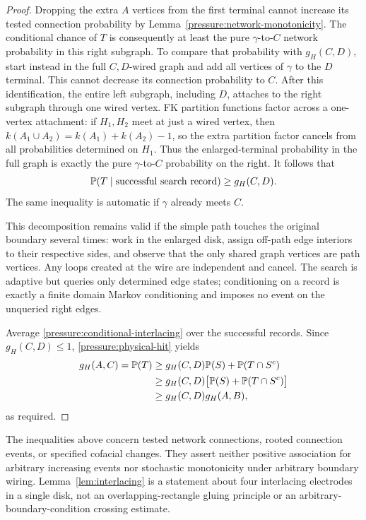 \begin{proof}
Dropping the extra $A$ vertices from the first terminal cannot increase
its tested connection probability by
Lemma~\ref{pressure:network-monotonicity}. The conditional chance
of $T$ is consequently at least the pure $\gamma$-to-$C$ network
probability in this right subgraph. To compare that probability
with $g_H(C,D)$, start instead in the full $C,D$-wired graph and add
all vertices of $\gamma$ to the $D$ terminal. This cannot decrease its
connection probability to $C$. After this identification, the
entire left subgraph, including $D$, attaches to the right subgraph
through one wired vertex. FK partition functions factor across a
one-vertex attachment: if $H_1,H_2$ meet at just a wired vertex,
then $k(A_1\cup A_2)=k(A_1)+k(A_2)-1$, so the extra partition
factor cancels from all probabilities determined on $H_1$.
Thus the enlarged-terminal probability in the full graph is exactly
the pure $\gamma$-to-$C$ probability on the right. It follows that
\begin{equation}
 \mathbb P(T\mid\text{successful search record})\ge g_H(C,D).
 \label{pressure:conditional-interlacing}
\end{equation}
The same inequality is automatic if $\gamma$ already meets $C$.

This decomposition remains valid if the simple path touches the
original boundary several times: work in the enlarged disk,
assign off-path edge interiors to their respective sides, and
observe that the only shared graph vertices are path vertices.
Any loops created at the wire are independent and cancel.
The search is adaptive but queries only determined edge states;
conditioning on a record is exactly a finite domain Markov
conditioning and imposes no event on the unqueried right edges.

Average \eqref{pressure:conditional-interlacing} over the successful
records. Since $g_H(C,D)\le1$, \eqref{pressure:physical-hit} yields
\begin{align*}
 g_H(A,C)=\mathbb P(T)
 &\ge g_H(C,D)\mathbb P(S)+\mathbb P(T\cap S^c)\\
 &\ge g_H(C,D)\bigl[\mathbb P(S)+\mathbb P(T\cap S^c)\bigr]\\
 &\ge g_H(C,D)g_H(A,B),
\end{align*}
as required.
\end{proof}

\begin{remark}
\label{pressure:scope}
The inequalities above concern tested network connections, rooted
connection events, or specified cofacial changes. They assert
neither positive association for arbitrary increasing events nor
stochastic monotonicity under arbitrary boundary wiring.
Lemma~\ref{lem:interlacing} is a statement about four interlacing
electrodes in a single disk, not an overlapping-rectangle gluing
principle or an arbitrary-boundary-condition crossing estimate.
\end{remark}
